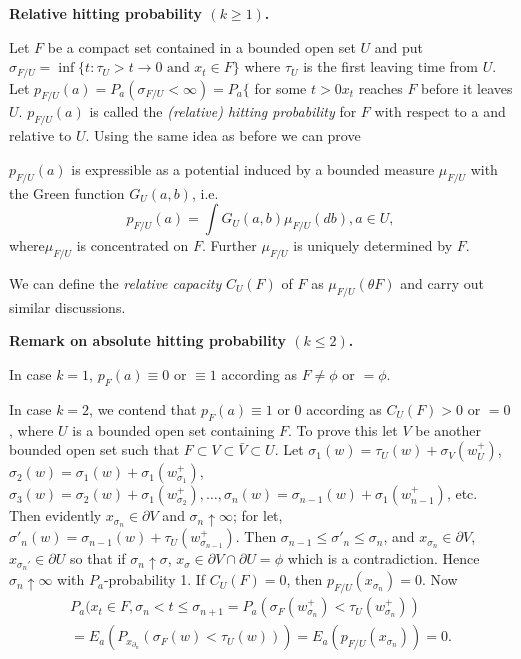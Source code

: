 \medskip
\noindent
\textbf{Relative hitting probability {\boldmath$(k \geq 1)$}.}
\smallskip

Let $F$ be a compact set contained in a bounded open set $U$ and put
$\sigma_{F / U} = \inf \{t : \tau_U > t\to 0 \text{\ and \ } x_t \in F \}$ where
$\tau_U$ is the first leaving time from $U$. Let $p_{F/U}(a) = P_a
(\sigma_{F/U} < \infty) = P_a \{$ for some $t > 0 x_t$ reaches $F$
before it leaves $U$. $p_{F/U}(a)$ is called the \textit{(relative)
  hitting probability} for $F$ with respect to a and relative to
$U$. Using the same idea as before we can prove 	 

\setcounter{dashthm}{0}
\begin{dashthm}\label{chap3-sec6-dashthm1}%
  $p_{F/U}(a)$ is expressible as a potential induced by a bounded
  measure $\mu_{F/U}$ with the Green function $G_U (a, b)$, i.e. 
  $$
  p_{F/U}(a) = \int G_U (a, b) \mu_{F/U}(db), a \in U,
  $$
  where\pageoriginale $\mu_{F/U}$ is concentrated on $F$. Further
  $\mu_{F/U}$ is uniquely determined by $F$. 
\end{dashthm}

We can define the \textit{relative capacity} $C_U(F)$ of $F$ as
$\mu_{F/U}(\theta F)$ and carry out similar discussions. 

\medskip
\noindent
\textbf{Remark on absolute hitting probability {\boldmath$(k \leq 2)$}.}
\smallskip

In case $k = 1$, $p_F (a) \equiv 0$ or $\equiv 1$ according as $F \neq
\phi$ or $= \phi$. 

In case $k =2$, we contend that $p_F(a) \equiv 1$ or $0$ according as
$C_U (F) > 0$ or $= 0$, where $U$ is a bounded open set containing
$F$. To prove this let $V$ be another bounded open set such that $F
\subset V \subset \bar{V} \subset U$. Let $\sigma_1(w) = \tau_U(w) +
\sigma_V (w^+_U)$, $\sigma_2(w) = \sigma_1 (w) + \sigma_1
(w^+_{\sigma_1})$, $\sigma_3(w) = \sigma_2(w) + \sigma_{1} (w^+_{\sigma_2}),
\ldots , \sigma_n(w) = \sigma_{n-1}(w) + \sigma_1 (w^+_{n-1})$,
etc. Then evidently $x_{\sigma_n} \in \partial V$ and $\sigma_n
\uparrow \infty$; for let, $\sigma'_n(w) = \sigma_{n-1}(w) + \tau_U
(w^+_{\sigma_{n-1}})$. Then $\sigma_{n-1} \leq \sigma'_n \leq
\sigma_n$, and $x_{\sigma_n} \in \partial V$, $x_{\sigma_n'} \in
\partial U$ so that if $\sigma_n \uparrow \sigma$, $x_\sigma \in
\partial V \cap \partial U = \phi$ which is a contradiction. Hence
$\sigma_n \uparrow \infty$ with $P_a$-probability 1. If $C_U(F) =
0$, then $p_{F/U}(x_{\sigma_n}) = 0$. Now 
\begin{multline*}
  P_a (x_t \in F, \sigma _n < t \leq \sigma_{n+1} = P_a (\sigma_F
  (w^+_{\sigma_n}) < \tau_U (w^+_{\sigma_n}))\\ 
  = E_a (P_{x_{\partial_n}}(\sigma_F (w) < \tau_U (w))) = E_a
  (p_{F/U}(x_{\sigma_n})) = 0. 
\end{multline*}

